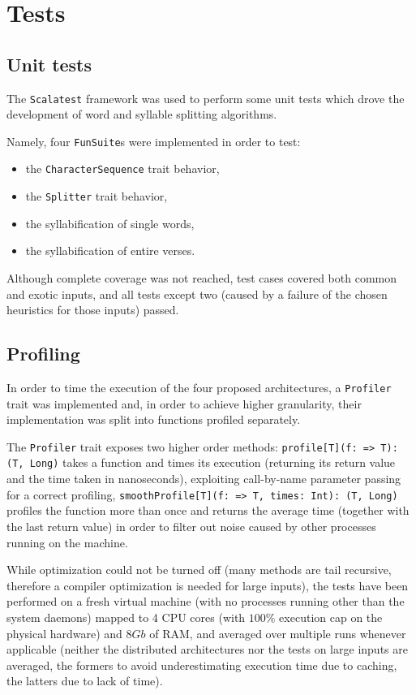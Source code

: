 \chapter{Tests}

\section{Unit tests}
The \texttt{Scalatest} framework was used to perform some unit tests which drove the development of word and syllable splitting algorithms.

Namely, four \texttt{FunSuite}s were implemented in order to test:
\begin{itemize}
	\item the \texttt{CharacterSequence} trait behavior,
	\item the \texttt{Splitter} trait behavior,
	\item the syllabification of single words,
	\item the syllabification of entire verses.
\end{itemize}

Although complete coverage was not reached, test cases covered both common and exotic inputs, and all tests except two (caused by a failure of the chosen heuristics for those inputs) passed.

\section{Profiling}

In order to time the execution of the four proposed architectures, a \texttt{Profiler} trait was implemented and, in order to achieve higher granularity, their implementation was split into functions profiled separately.

The \texttt{Profiler} trait exposes two higher order methods: \texttt{profile[T](f: => T): (T, Long)} takes a function and times its execution (returning its return value and the time taken in nanoseconds), exploiting call-by-name parameter passing for a correct profiling, \texttt{smoothProfile[T](f: => T, times: Int): (T, Long)} profiles the function more than once and returns the average time (together with the last return value) in order to filter out noise caused by other processes running on the machine.

While optimization could not be turned off (many methods are tail recursive, therefore a compiler optimization is needed for large inputs), the tests have been performed on a fresh virtual machine (with no processes running other than the system daemons) mapped to 4 CPU cores (with $100 \%$ execution cap on the physical hardware) and $8 Gb$ of RAM, and averaged over multiple runs whenever applicable (neither the distributed architectures nor the tests on large inputs are averaged, the formers to avoid underestimating execution time due to caching, the latters due to lack of time).

